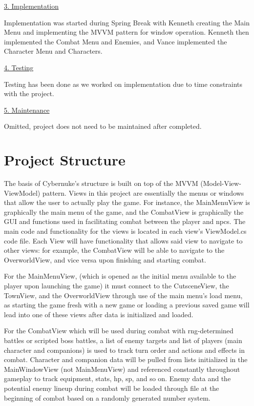 \documentclass[10pt,conference,onecolumn,compsoc]{IEEEtran}
\begin{document}
\underline{3. Implementation}
\vspace{5px}

Implementation was started during Spring Break with Kenneth creating the Main Menu and implementing the MVVM pattern for window operation. Kenneth then implemented the Combat Menu and Enemies, and Vance implemented the Character Menu and Characters.

\underline{4. Testing}
\vspace{5px}

Testing has been done as we worked on implementation due to time constraints with the project.

\underline{5. Maintenance}
\vspace{5px}

Omitted, project does not need to be maintained after completed.


\section{Project Structure}

The basis of Cybernuke's structure is built on top of the MVVM (Model-View-ViewModel) pattern. Views in this project are essentially the menus or windows that allow the user to actually play the game. For instance, the MainMenuView is graphically the main menu of the game, and the CombatView is graphically the GUI and functions used in facilitating combat between the player and npcs. The main code and functionality for the views is located in each view's ViewModel.cs code file. Each View will have functionality that allows said view to navigate to other views: for example, the CombatView will be able to navigate to the OverworldView, and vice versa upon finishing and starting combat.

For the MainMenuView, (which is opened as the initial menu available to the player upon launching the game) it must connect to the CutsceneView, the TownView, and the OverworldView through use of the main menu's load menu, as starting the game fresh with a new game or loading a previous saved game will lead into one of these views after data is initialized and loaded. 

For the CombatView which will be used during combat with rng-determined battles or scripted boss battles, a list of enemy targets and list of players (main character and companions) is used to track turn order and actions and effects in combat. Character and companion data will be pulled from lists initialized in the MainWindowView (not MainMenuView) and referenced constantly throughout gameplay to track equipment, stats, hp, sp, and so on. Enemy data and the potential enemy lineup during combat will be loaded through file at the beginning of combat based on a randomly generated number system.
\end{document}
